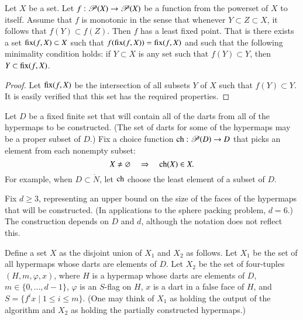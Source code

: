 \begin{lemma}   
Let $X$ be a set.  Let $f:{\mathscr P}(X)\to {\mathscr P}(X)$ be a
function from the powerset of $X$ to itself.  Assume that $f$ is
monotonic in the sense that whenever $Y\subset Z\subset X$, it
follows that $f(Y) \subset f(Z)$.  Then $f$ has a least fixed point.
That is there exists a set ${\operatorname{fix}}(f,X)\subset X$ such that
$f({\operatorname{fix}}(f,X)) = {\operatorname{fix}}(f,X)$ and such that the following
minimality condition holds: if $Y\subset X$ is any set such that
$f(Y) \subset Y$, then $Y\subset {\operatorname{fix}}(f,X)$.
\end{lemma}
%
%
%
%
%

\begin{proof} Let ${\operatorname{fix}}(f,X)$ be the intersection of all subsets
$Y$ of $X$ such that $f(Y)\subset Y$.  It is easily verified that
this set has the required properties.
\end{proof}


Let $D$ be a fixed finite set that will contain all of the darts from
all of the hypermaps to be constructed.  (The set of darts for some of
the hypermaps may be a proper subset of $D$.)  Fix a choice function
${\operatorname{ch}}:{\mathscr P}(D)\to D$ that picks an element from each nonempty
subset:
\begin{displaymath}
X\ne\varnothing\quad  \Rightarrow \quad  {\operatorname{ch}}(X)\in X.
\end{displaymath}
 For example, when
$D\subset\ring{N}$, let ${\operatorname{ch}}$ choose the least element of a subset
of $D$.

Fix $d\ge 3$, representing an upper bound on the size of the faces of
the hypermaps that will be constructed.  (In applications to the
sphere packing problem, $d=6$.)  The construction depends on $D$ and
$d$, although the notation does not reflect this.
%

Define a set $X$ as the disjoint union of $X_1$ and $X_2$ as follows.
Let $X_1$ be the set of all hypermaps whose darts are elements of $D$.
Let $X_2$ be the set of four-tuples $(H,m,\varphi,x)$, where $H$ is a
hypermap whose darts are elements of $D$, $m\in\{0,\ldots,d-1\}$,
$\varphi$ is an $S$-flag on $H$, $x$ is a dart in a false face of $H$,
and $S = \{f^i x\mid 1 \le i \le m\}$.  (One may think of $X_1$ as
holding the output of the algorithm and $X_2$ as holding the partially
constructed hypermaps.)

